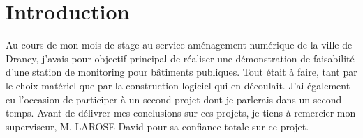 \chapter*{Introduction}



Au cours de mon mois de stage au service aménagement numérique de la ville de Drancy, j'avais pour objectif principal de réaliser une démonstration de faisabilité d'une station de monitoring pour bâtiments publiques. Tout était à faire, tant par le choix matériel que par la construction logiciel qui en découlait. J'ai également eu l'occasion de participer à un second projet dont je parlerais dans un second temps. Avant de délivrer mes conclusions sur ces projets, je tiens à remercier mon superviseur, M. LAROSE David pour sa confiance totale sur ce projet.
